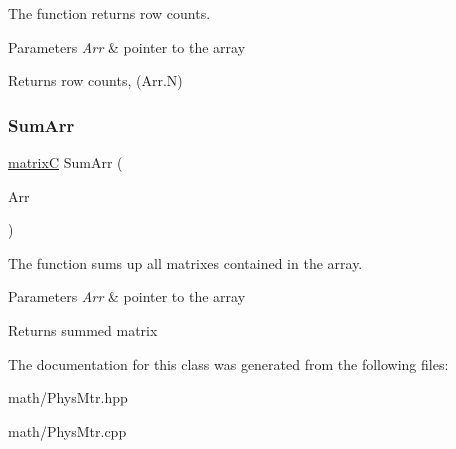 The function returns row counts. 


\begin{DoxyParams}{Parameters}
{\em Arr} & pointer to the array \\
\hline
\end{DoxyParams}
\begin{DoxyReturn}{Returns}
row counts, (Arr.\+N) 
\end{DoxyReturn}
\mbox{\label{class_arr2_d_c_a53869598c61113fadda2f980309c2447}} 
\subsubsection{\texorpdfstring{Sum\+Arr}{SumArr}}
{\footnotesize\ttfamily \mbox{\hyperlink{classmatrix_c}{matrixC}} Sum\+Arr (\begin{DoxyParamCaption}\item[{const \mbox{\hyperlink{class_arr2_d_c}{Arr2\+DC}} \&}]{Arr }\end{DoxyParamCaption})\hspace{0.3cm}{\ttfamily [friend]}}



The function sums up all matrixes contained in the array. 


\begin{DoxyParams}{Parameters}
{\em Arr} & pointer to the array \\
\hline
\end{DoxyParams}
\begin{DoxyReturn}{Returns}
summed matrix 
\end{DoxyReturn}


The documentation for this class was generated from the following files\+:\begin{DoxyCompactItemize}
\item 
math/Phys\+Mtr.\+hpp\item 
math/Phys\+Mtr.\+cpp\end{DoxyCompactItemize}
